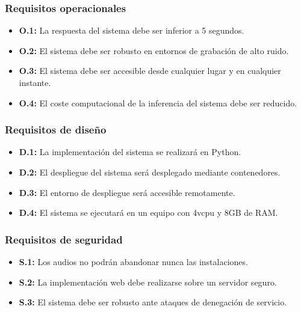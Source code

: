 \subsubsection{Requisitos operacionales}\label{sec:requisitos-operacionales}
\begin{itemize}\itemsep1pt \parskip0pt 
    \item \textbf{O.1:} La respuesta del sistema debe ser inferior a 5 segundos.
    \item \textbf{O.2:} El sistema debe ser robusto en entornos de grabación de alto ruido.
    \item \textbf{O.3:} El sistema debe ser accesible desde cualquier lugar y en cualquier instante.
    \item \textbf{O.4:} El coste computacional de la inferencia del sistema debe ser reducido.
\end{itemize}

\subsubsection{Requisitos de diseño}\label{sec:requisitos-diseno}
\begin{itemize}\itemsep1pt \parskip0pt 
    \item \textbf{D.1:} La implementación del sistema se realizará en Python.
    \item \textbf{D.2:} El despliegue del sistema será desplegado mediante contenedores.
    \item \textbf{D.3:} El entorno de despliegue será accesible remotamente.
    \item \textbf{D.4:} El sistema se ejecutará en un equipo con 4vcpu y 8GB de RAM.
\end{itemize}

\subsubsection{Requisitos de seguridad}\label{sec:requisitos-seguridad}
\begin{itemize}\itemsep1pt \parskip0pt 
    \item \textbf{S.1:} Los audios no podrán abandonar nunca las instalaciones.
    \item \textbf{S.2:} La implementación web debe realizarse sobre un servidor seguro.
    \item \textbf{S.3:} El sistema debe ser robusto ante ataques de denegación de servicio.
\end{itemize}

